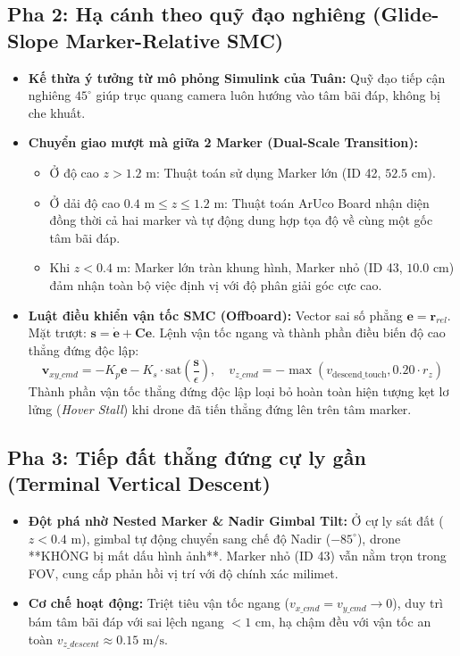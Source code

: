 \documentclass[12pt,a4paper]{article}
\begin{document}
\subsection{Pha 2: Hạ cánh theo quỹ đạo nghiêng (Glide-Slope Marker-Relative SMC)}
\begin{itemize}[noitemsep,topsep=2pt]
    \item \textbf{Kế thừa ý tưởng từ mô phỏng Simulink của Tuân:} Quỹ đạo tiếp cận nghiêng $45^\circ$ giúp trục quang camera luôn hướng vào tâm bãi đáp, không bị che khuất.
    \item \textbf{Chuyển giao mượt mà giữa 2 Marker (Dual-Scale Transition):}
    \begin{itemize}[noitemsep]
        \item Ở độ cao $z > 1.2\text{ m}$: Thuật toán sử dụng Marker lớn (ID 42, $52.5\text{ cm}$).
        \item Ở dải độ cao $0.4\text{ m} \le z \le 1.2\text{ m}$: Thuật toán ArUco Board nhận diện đồng thời cả hai marker và tự động dung hợp tọa độ về cùng một gốc tâm bãi đáp.
        \item Khi $z < 0.4\text{ m}$: Marker lớn tràn khung hình, Marker nhỏ (ID 43, $10.0\text{ cm}$) đảm nhận toàn bộ việc định vị với độ phân giải góc cực cao.
    \end{itemize}
    \item \textbf{Luật điều khiển vận tốc SMC (Offboard):}
    Vector sai số phẳng $\mathbf{e} = \mathbf{r}_{rel}$. Mặt trượt: $\mathbf{s} = \dot{\mathbf{e}} + \mathbf{C}\mathbf{e}$. Lệnh vận tốc ngang và thành phần điều biến độ cao thẳng đứng độc lập:
    \begin{equation}
        \mathbf{v}_{xy\_cmd} = -K_p \mathbf{e} - K_s \cdot \text{sat}\left(\frac{\mathbf{s}}{\epsilon}\right), \quad v_{z\_cmd} = -\max\left(v_{\text{descend\_touch}}, 0.20 \cdot r_z\right)
    \end{equation}
    Thành phần vận tốc thẳng đứng độc lập loại bỏ hoàn toàn hiện tượng kẹt lơ lửng (\textit{Hover Stall}) khi drone đã tiến thẳng đứng lên trên tâm marker.
\end{itemize}

\subsection{Pha 3: Tiếp đất thẳng đứng cự ly gần (Terminal Vertical Descent)}
\begin{itemize}[noitemsep,topsep=2pt]
    \item \textbf{Đột phá nhờ Nested Marker \& Nadir Gimbal Tilt:} Ở cự ly sát đất ($z < 0.4\text{ m}$), gimbal tự động chuyển sang chế độ Nadir ($-85^\circ$), drone **KHÔNG bị mất dấu hình ảnh**. Marker nhỏ (ID 43) vẫn nằm trọn trong FOV, cung cấp phản hồi vị trí với độ chính xác milimet.
    \item \textbf{Cơ chế hoạt động:} Triệt tiêu vận tốc ngang ($v_{x\_cmd} = v_{y\_cmd} \to 0$), duy trì bám tâm bãi đáp với sai lệch ngang $< 1\text{ cm}$, hạ chậm đều với vận tốc an toàn $v_{z\_descent} \approx 0.15\text{ m/s}$.
\end{itemize}
\end{document}
